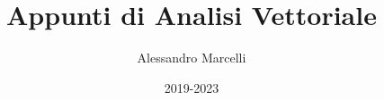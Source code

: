 \documentclass[a4paper,12pt]{book}
\newcommand{\R}{\mathbb{R}}
\newcommand{\taleche}{\, : \,}
\begin{document}
\newcommand{\deffuncR}[2]{f \taleche A\subseteq \R^{#1} \longrightarrow \R^{#2} }
\newcommand{\deffuncRgen}[3]{#1 \taleche A\subseteq \R^{#2} \longrightarrow \R^{#3} }
\newcommand{\deffuncRn}{f \taleche A\subseteq \R^n \longrightarrow \R^n}

\author{Alessandro Marcelli}
\title{Appunti di Analisi Vettoriale}
\date{2019-2023}


\frontmatter
\maketitle
\tableofcontents

\mainmatter





\backmatter
\end{document}
